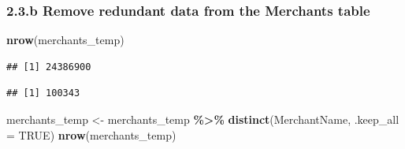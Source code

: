 \documentclass[
]{article}
\newenvironment{Shaded}{\begin{snugshade}}{\end{snugshade}}
\newcommand{\AttributeTok}[1]{\textcolor[rgb]{0.13,0.29,0.53}{#1}}
\newcommand{\ConstantTok}[1]{\textcolor[rgb]{0.56,0.35,0.01}{#1}}
\newcommand{\FunctionTok}[1]{\textcolor[rgb]{0.13,0.29,0.53}{\textbf{#1}}}
\newcommand{\NormalTok}[1]{#1}
\newcommand{\OtherTok}[1]{\textcolor[rgb]{0.56,0.35,0.01}{#1}}
\newcommand{\SpecialCharTok}[1]{\textcolor[rgb]{0.81,0.36,0.00}{\textbf{#1}}}
\begin{document}
\begin{Shaded}
\end{Shaded}

\subsubsection{2.3.b Remove redundant data from the Merchants
table}\label{b-remove-redundant-data-from-the-merchants-table}

\begin{Shaded}
\begin{Highlighting}[]
\FunctionTok{nrow}\NormalTok{(merchants\_temp)}
\end{Highlighting}
\end{Shaded}

\begin{verbatim}
## [1] 24386900
\end{verbatim}

\begin{Shaded}
\end{Shaded}

\begin{verbatim}
## [1] 100343
\end{verbatim}

\begin{Shaded}
\begin{Highlighting}[]
\NormalTok{merchants\_temp }\OtherTok{\textless{}{-}}\NormalTok{ merchants\_temp }\SpecialCharTok{\%\textgreater{}\%} \FunctionTok{distinct}\NormalTok{(MerchantName, }\AttributeTok{.keep\_all =} \ConstantTok{TRUE}\NormalTok{)}
\FunctionTok{nrow}\NormalTok{(merchants\_temp)}
\end{Highlighting}
\end{Shaded}
\end{document}
